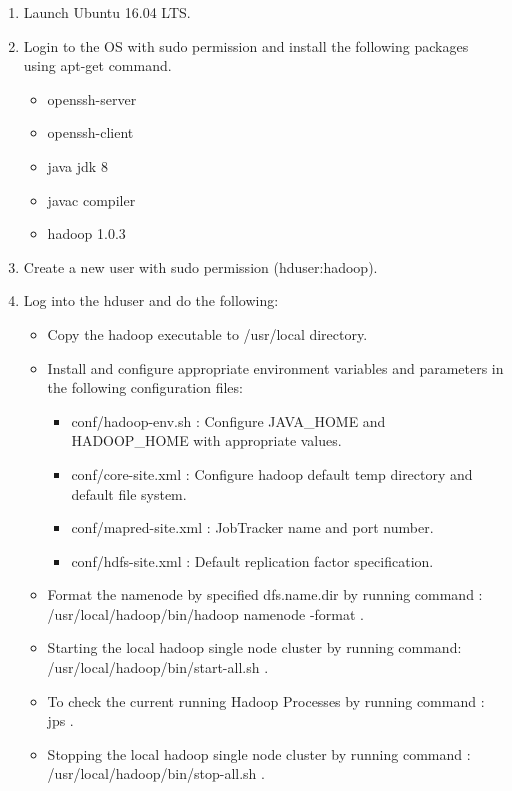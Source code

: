 \documentclass[a4paper,10pt]{article}
\begin{document}
\begin{enumerate}
	\item Launch Ubuntu 16.04 LTS.
	\item Login to the OS with sudo permission and install the following packages using apt-get command.
	\begin{itemize}
		\item openssh-server
		\item openssh-client
		\item java jdk 8
		\item javac compiler
                     \item hadoop 1.0.3
	\end{itemize}
	\item Create a new user with sudo permission (hduser:hadoop).
    \item Log into the hduser and do the following:
    \begin{itemize}
    	\item Copy the hadoop executable to /usr/local directory.
    	\item Install and configure appropriate environment variables and parameters in the following configuration files: 
    	\begin{itemize}
    		\item conf/hadoop-env.sh : Configure JAVA\_HOME and HADOOP\_HOME with appropriate values.
    		\item conf/core-site.xml : Configure hadoop default temp directory and default file system.
    		\item conf/mapred-site.xml : JobTracker name and port number.
    		\item conf/hdfs-site.xml : Default replication factor specification.
    	\end{itemize}
        \item Format the namenode by specified dfs.name.dir by running command : /usr/local/hadoop/bin/hadoop namenode -format .
        \item Starting the local hadoop single node cluster by running command: 
        /usr/local/hadoop/bin/start-all.sh .
        \item To check the current running Hadoop Processes by running command : 
        jps .
        \item Stopping the local hadoop single node cluster by running command : 
        /usr/local/hadoop/bin/stop-all.sh .
    \end{itemize}
\pagebreak
\end{enumerate}
\end{document}

